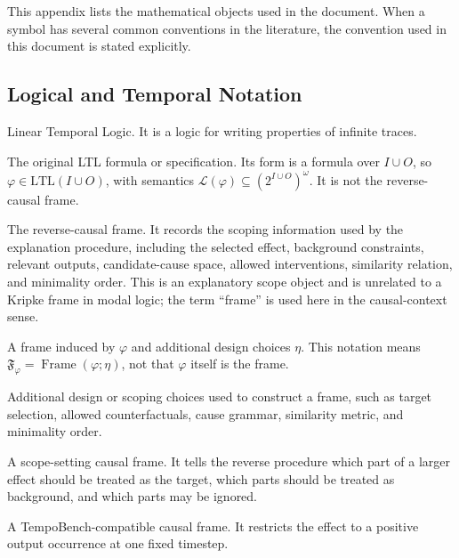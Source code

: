 \documentclass[11pt]{article}
\theoremstyle{remark}
\newcommand{\LTL}{\mathrm{LTL}}
\newcommand{\Lang}{\mathcal{L}}
\newcommand{\Frame}{\mathfrak{F}}
\newcommand{\Design}{\eta}
\begin{document}
This appendix lists the mathematical objects used in the document. When a
symbol has several common conventions in the literature, the convention used in
this document is stated explicitly.

\subsection*{Logical and Temporal Notation}

\begin{description}[leftmargin=2.8cm,style=nextline]
  \item[\(\LTL\)]
  Linear Temporal Logic. It is a logic for writing properties of infinite
  traces.

  \item[\(\varphi,\varphi_{\LTL}\)]
  The original LTL formula or specification. Its form is a formula over
  \(I\cup O\), so \(\varphi\in\LTL(I\cup O)\), with semantics
  \(\Lang(\varphi)\subseteq(2^{I\cup O})^\omega\). It is not the
  reverse-causal frame.

  \item[\(\Frame\)]
  The reverse-causal frame. It records the scoping information used by the
  explanation procedure, including the selected effect, background constraints,
  relevant outputs, candidate-cause space, allowed interventions, similarity
  relation, and minimality order. This is an explanatory scope object and is
  unrelated to a Kripke frame in modal logic; the term ``frame'' is used here in
  the causal-context sense.

  \item[\(\Frame_\varphi\)]
  A frame induced by \(\varphi\) and additional design choices \(\Design\).
  This notation means \(\Frame_\varphi=\operatorname{Frame}(\varphi;\Design)\),
  not that \(\varphi\) itself is the frame.

  \item[\(\Design\)]
  Additional design or scoping choices used to construct a frame, such as target
  selection, allowed counterfactuals, cause grammar, similarity metric, and
  minimality order.

  \item[\(\Frame_{\mathrm{scope}}\)]
  A scope-setting causal frame. It tells the reverse procedure which part of a
  larger effect should be treated as the target, which parts should be treated
  as background, and which parts may be ignored.

  \item[\(\Frame_{\mathrm{TB}}\)]
  A TempoBench-compatible causal frame. It restricts the effect to a positive
  output occurrence at one fixed timestep.


\end{description}
\end{document}
